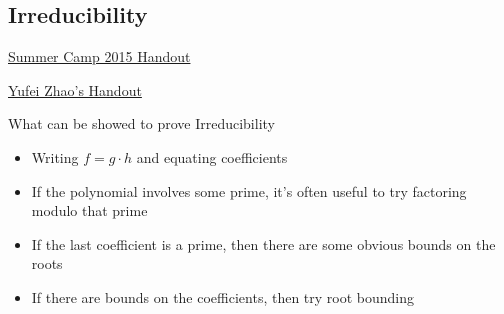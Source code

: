 \newpage\subsection{Irreducibility}

\begin{myitemize}
\item \href{https://euclid.ucc.ie/mathenr/IMOTraining/Polynomials2015.pdf}{Summer Camp 2015 Handout}
\item \href{http://yufeizhao.com/olympiad/intpoly.pdf}{Yufei Zhao's Handout}
\end{myitemize}


\begin{take_note*}{What can be showed to prove Irreducibility}
    \begin{itemize}[wide=5pt]
        \item Writing $ f = g\cdot h $ and equating coefficients
        \item If the polynomial involves some prime, it's often useful to try factoring modulo that prime
        \item If the last coefficient is a prime, then there are some obvious bounds on the roots
        \item If there are bounds on the coefficients, then try root bounding
    \end{itemize}
\end{take_note*}

\bigskip 

\begin{minipage}[t]{.48\linewidth}
\end{minipage}\hfill%
\begin{minipage}[t]{.48\linewidth}
\end{minipage}

\bigskip

